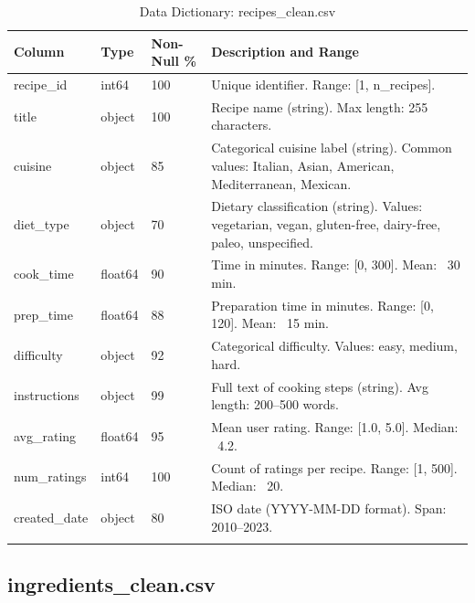 \documentclass[11pt,a4paper]{article}
\begin{document}
\begin{longtable}{|p{2.5cm}|p{1.5cm}|p{2.5cm}|p{6.5cm}|}
    \hline
    \textbf{Column} & \textbf{Type} & \textbf{Non-Null \%} & \textbf{Description and Range} \\
    \hline
    \endhead
    
    recipe\_id & int64 & 100 & Unique identifier. Range: [1, n\_recipes]. \\
    \hline
    title & object & 100 & Recipe name (string). Max length: 255 characters. \\
    \hline
    cuisine & object & 85 & Categorical cuisine label (string). Common values: Italian, Asian, American, Mediterranean, Mexican. \\
    \hline
    diet\_type & object & 70 & Dietary classification (string). Values: vegetarian, vegan, gluten-free, dairy-free, paleo, unspecified. \\
    \hline
    cook\_time & float64 & 90 & Time in minutes. Range: [0, 300]. Mean: ~30 min. \\
    \hline
    prep\_time & float64 & 88 & Preparation time in minutes. Range: [0, 120]. Mean: ~15 min. \\
    \hline
    difficulty & object & 92 & Categorical difficulty. Values: easy, medium, hard. \\
    \hline
    instructions & object & 99 & Full text of cooking steps (string). Avg length: 200--500 words. \\
    \hline
    avg\_rating & float64 & 95 & Mean user rating. Range: [1.0, 5.0]. Median: ~4.2. \\
    \hline
    num\_ratings & int64 & 100 & Count of ratings per recipe. Range: [1, 500]. Median: ~20. \\
    \hline
    created\_date & object & 80 & ISO date (YYYY-MM-DD format). Span: 2010--2023. \\
    \hline
    
    \caption{Data Dictionary: recipes\_clean.csv}
    \label{tab:dd_recipes}
\end{longtable}

\subsection{ingredients\_clean.csv}
\end{document}
